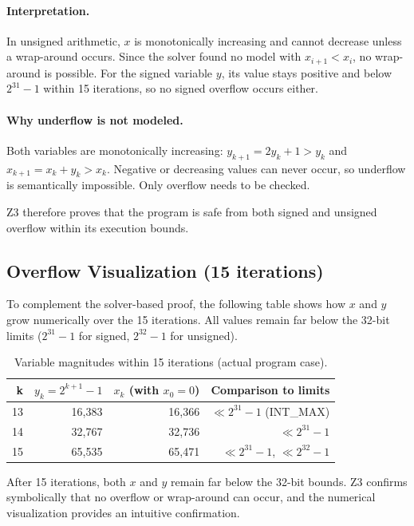 \documentclass{article}
\begin{document}
\paragraph{Interpretation.}
In unsigned arithmetic, $x$ is monotonically increasing and cannot decrease
unless a wrap-around occurs. Since the solver found no model with $x_{i+1}<x_i$,
no wrap-around is possible. For the signed variable $y$, its value stays
positive and below $2^{31}-1$ within 15 iterations, so no signed overflow
occurs either.

\paragraph{Why underflow is not modeled.}
Both variables are monotonically increasing:
$y_{k+1}=2y_k+1>y_k$ and $x_{k+1}=x_k+y_k>x_k$.
Negative or decreasing values can never occur, so underflow is semantically
impossible. Only overflow needs to be checked.

\noindent
Z3 therefore proves that the program is safe from both signed and unsigned
overflow within its execution bounds.

\subsection*{Overflow Visualization (15 iterations)}

To complement the solver-based proof, the following table shows how $x$ and $y$
grow numerically over the 15 iterations. All values remain far below the 32-bit
limits ($2^{31}-1$ for signed, $2^{32}-1$ for unsigned).

\begin{table}[h]
\centering
\begin{tabular}{r|r|r|r}
\textbf{k} & \(y_k = 2^{k+1}-1\) & \(x_k\) (with \(x_0=0\)) & Comparison to limits \\\hline
13 & 16,383 & 16,366 & $\ll 2^{31}-1$ (INT\_MAX) \\
14 & 32,767 & 32,736 & $\ll 2^{31}-1$ \\
15 & 65,535 & 65,471 & $\ll 2^{31}-1$, $\ll 2^{32}-1$
\end{tabular}
\caption{Variable magnitudes within 15 iterations (actual program case).}
\end{table}

\noindent
After 15 iterations, both $x$ and $y$ remain far below the 32-bit bounds.
Z3 confirms symbolically that no overflow or wrap-around can occur,
and the numerical visualization provides an intuitive confirmation.
\end{document}
